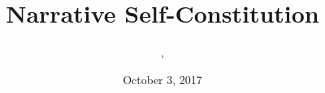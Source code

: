 \documentclass[xcolor=dvipsnames]{beamer}
\title{Narrative Self-Constitution}
\subtitle{{\CourseNumber}, {\CourseInst}}
\author{\CourseName}
\date{October 3, 2017}
\begin{document}
\begin{frame}
  \titlepage
\end{frame}



\end{document}
